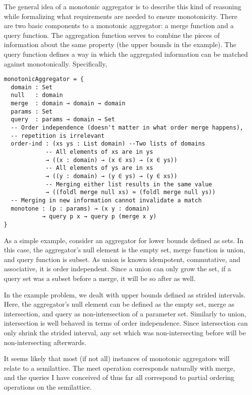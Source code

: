 The general idea of a monotonic aggregator is to describe this kind of reasoning while formalizing what requirements are needed to ensure monotonicity.
There are two basic components to a monotonic aggregator: a merge function and a query function.
The aggregation function serves to combine the pieces of information about the same property (the upper bounds in the example).
The query function defines a way in which the aggregated information can be matched against monotonically.
Specifically,
\begin{verbatim}
monotonicAggregator = {
  domain : Set
  null   : domain
  merge  : domain → domain → domain
  params : Set
  query  : params → domain → Set
  -- Order independence (doesn't matter in what order merge happens),
  -- repetition is irrelevant
  order-ind : (xs ys : List domain) --Two lists of domains
            -- All elements of xs are in ys
            → ((x : domain) → (x ∈ xs) → (x ∈ ys))
            -- All elements of ys are in xs
            → ((y : domain) → (y ∈ ys) → (y ∈ xs))
            -- Merging either list results in the same value
            → ((foldl merge null xs) ≈ (foldl merge null ys))
  -- Merging in new information cannot invalidate a match
  monotone : (p : params) → (x y : domain)
           → query p x → query p (merge x y)
}
\end{verbatim}

As a simple example, consider an aggregator for lower bounds defined as sets.
In this case, the aggregator's null element is the empty set, merge function is union, and query function is subset.
As union is known idempotent, commutative, and associative, it is order independent.
Since a union can only grow the set, if a query set was a subset before a merge, it will be so after as well.

In the example problem, we dealt with upper bounds defined as strided intervals.
Here, the aggregator's null element can be defined as the empty set, merge as intersection, and query as non-intersection of a parameter set.
Similarly to union, intersection is well behaved in terms of order independence.
Since intersection can only shrink the strided interval, any set which was non-intersecting before will be non-intersecting afterwards.

It seems likely that most (if not all) instances of monotonic aggregators will relate to a semilattice.
The meet operation corresponds naturally with merge, and the queries I have conceived of thus far all correspond to partial ordering operations on the semilattice.

